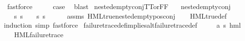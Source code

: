 \begin{isabellebody}
\ fastforce\isanewline
\ \ \isamarkupfalse%
\ \isamarkupfalse%
\ {\isacharquery}{\kern0pt}case\ \isamarkupfalse%
\ blast\isanewline
{}\isamarkupfalse%
%
\endisatagproof
{\isafoldproof}%
%
\isadelimproof
\isanewline
%
\endisadelimproof
\isanewline
{}\isamarkupfalse%
\ nested{\isacharunderscore}{\kern0pt}empty{\isacharunderscore}{\kern0pt}conj{\isacharunderscore}{\kern0pt}TT{\isacharunderscore}{\kern0pt}or{\isacharunderscore}{\kern0pt}FF{\isacharcolon}{\kern0pt}\isanewline
\ \ \ {\isachardoublequoteopen}nested{\isacharunderscore}{\kern0pt}empty{\isacharunderscore}{\kern0pt}conj\ {\isasymphi}{\isachardoublequoteclose}\isanewline
\ \ \ {\isachardoublequoteopen}{\isacharparenleft}{\kern0pt}{\isasymforall}s{\isachardot}{\kern0pt}\ {\isacharparenleft}{\kern0pt}s\ {\isasymTurnstile}\ {\isasymphi}{\isacharparenright}{\kern0pt}{\isacharparenright}{\kern0pt}\ {\isasymor}\ {\isacharparenleft}{\kern0pt}{\isasymforall}s{\isachardot}{\kern0pt}\ {\isasymnot}{\isacharparenleft}{\kern0pt}s\ {\isasymTurnstile}\ {\isasymphi}{\isacharparenright}{\kern0pt}{\isacharparenright}{\kern0pt}{\isachardoublequoteclose}\isanewline
%
\isadelimproof
\ \ %
\endisadelimproof
%
\isatagproof
{}\isamarkupfalse%
\ assms\ HML{\isacharunderscore}{\kern0pt}true{\isacharunderscore}{\kern0pt}nested{\isacharunderscore}{\kern0pt}empty{\isacharunderscore}{\kern0pt}pos{\isacharunderscore}{\kern0pt}conj\isanewline
\ \ \isamarkupfalse%
\ HML{\isacharunderscore}{\kern0pt}true{\isacharunderscore}{\kern0pt}def\isanewline
\ \ \isamarkupfalse%
{\isacharparenleft}{\kern0pt}induction{\isacharcomma}{\kern0pt}\ simp{\isacharcomma}{\kern0pt}\ fastforce{\isacharparenright}{\kern0pt}%
\endisatagproof
{\isafoldproof}%
%
\isadelimproof
\isanewline
%
\endisadelimproof
\isanewline
{}\isamarkupfalse%
\ failure{\isacharunderscore}{\kern0pt}trace{\isacharunderscore}{\kern0pt}def{\isacharunderscore}{\kern0pt}implies{\isacharunderscore}{\kern0pt}alt{\isacharunderscore}{\kern0pt}failure{\isacharunderscore}{\kern0pt}trace{\isacharunderscore}{\kern0pt}def{\isacharcolon}{\kern0pt}\isanewline
\ \ \ {\isasymphi}\ {\isacharcolon}{\kern0pt}{\isacharcolon}{\kern0pt}\ {\isachardoublequoteopen}{\isacharparenleft}{\kern0pt}{\isacharprime}{\kern0pt}a{\isacharcomma}{\kern0pt}\ {\isacharprime}{\kern0pt}s{\isacharparenright}{\kern0pt}\ hml{\isachardoublequoteclose}\isanewline
\ \ \ {\isachardoublequoteopen}HML{\isacharunderscore}{\kern0pt}failure{\isacharunderscore}{\kern0pt}trace\ {\isasymphi}{\isachardoublequoteclose}\isanewline

\end{isabellebody}
